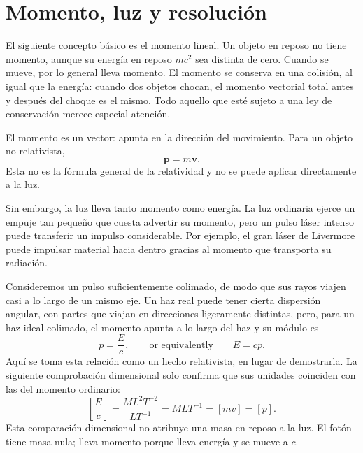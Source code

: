 \begin{classroomqa}
\end{classroomqa}

\section{Momento, luz y resolución}

El siguiente concepto básico es el momento lineal. Un objeto en reposo no tiene momento, aunque su energía en reposo \(mc^2\) sea distinta de cero. Cuando se mueve, por lo general lleva momento. El momento se conserva en una colisión, al igual que la energía: cuando dos objetos chocan, el momento vectorial total antes y después del choque es el mismo. Todo aquello que esté sujeto a una ley de conservación merece especial atención.

El momento es un vector: apunta en la dirección del movimiento. Para un objeto no relativista,
\begin{equation}
\mathbf p=m\mathbf v.
\end{equation}
Esta no es la fórmula general de la relatividad y no se puede aplicar directamente a la luz.

Sin embargo, la luz lleva tanto momento como energía. La luz ordinaria ejerce un empuje tan pequeño que cuesta advertir su momento, pero un pulso láser intenso puede transferir un impulso considerable. Por ejemplo, el gran láser de Livermore puede impulsar material hacia dentro gracias al momento que transporta su radiación.

Consideremos un pulso suficientemente colimado, de modo que sus rayos viajen casi a lo largo de un mismo eje. Un haz real puede tener cierta dispersión angular, con partes que viajan en direcciones ligeramente distintas, pero, para un haz ideal colimado, el momento apunta a lo largo del haz y su módulo es
\begin{equation}
p=\frac{E}{c},
\qquad\text{or equivalently}\qquad
E=cp.
\end{equation}
Aquí se toma esta relación como un hecho relativista, en lugar de demostrarla. La siguiente comprobación dimensional solo confirma que sus unidades coinciden con las del momento ordinario:
\begin{equation}
\left[\frac{E}{c}\right]
=
\frac{M L^2 T^{-2}}{L T^{-1}}
=
M L T^{-1}
=
[m v]
=
[p].
\end{equation}
Esta comparación dimensional no atribuye una masa en reposo a la luz. El fotón tiene masa nula; lleva momento porque lleva energía y se mueve a \(c\).

